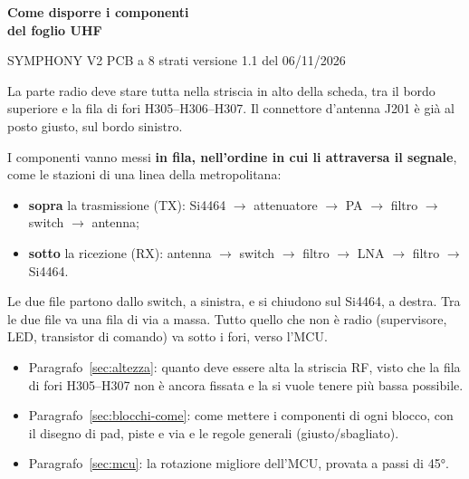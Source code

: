 \documentclass[a4paper,11pt]{article}
\begin{document}
\begin{center}
{\sffamily\bfseries\huge\color{sbblue} Come disporre i componenti\\[2pt] del foglio UHF}\par\vspace{3mm}
{\sffamily\large\color{sbgray} SYMPHONY V2 \textbullet{} PCB a 8 strati \textbullet{} versione 1.1 del 06/11/2026}
\end{center}
\vspace{2mm}

\begin{semplice}
La parte radio deve stare tutta nella striscia in alto della scheda, tra il bordo superiore e la fila di fori H305--H306--H307. Il connettore d'antenna J201 è già al posto giusto, sul bordo sinistro.

I componenti vanno messi \textbf{in fila, nell'ordine in cui li attraversa il segnale}, come le stazioni di una linea della metropolitana:
\begin{itemize}
\item \textbf{sopra} la trasmissione (TX): Si4464 $\to$ attenuatore $\to$ PA $\to$ filtro $\to$ switch $\to$ antenna;
\item \textbf{sotto} la ricezione (RX): antenna $\to$ switch $\to$ filtro $\to$ LNA $\to$ filtro $\to$ Si4464.
\end{itemize}
Le due file partono dallo switch, a sinistra, e si chiudono sul Si4464, a destra. Tra le due file va una fila di via a massa. Tutto quello che non è radio (supervisore, LED, transistor di comando) va sotto i fori, verso l'MCU.
\end{semplice}

\begin{nota}
\begin{itemize}[nosep]
\item Paragrafo~\ref{sec:altezza}: quanto deve essere alta la striscia RF, visto che la fila di fori H305--H307 non è ancora fissata e la si vuole tenere più bassa possibile.
\item Paragrafo~\ref{sec:blocchi-come}: come mettere i componenti di ogni blocco, con il disegno di pad, piste e via e le regole generali (giusto/sbagliato).
\item Paragrafo~\ref{sec:mcu}: la rotazione migliore dell'MCU, provata a passi di \ang{45}.
\end{itemize}
\end{nota}

\tableofcontents
\end{document}
